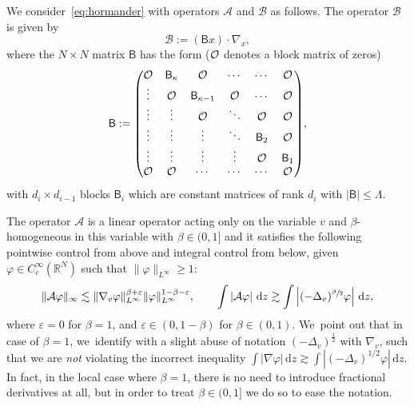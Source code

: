 \documentclass[10pt,a4paper]{amsart}
\let\epsilon\varepsilon
\theoremstyle{definition}
\newcommand\R{{\mathbb R}}
\newcommand{\cA}{{\mathcal A}}
\newcommand{\cB}{{\mathcal B}}
\newcommand{\sB}{{\mathsf B}}
\newcommand{\dd}{{\, \mathrm d}}
\begin{document}
We consider~\eqref{eq:hormander} with operators $\cA$ and $\cB$
as follows. The operator $\cB$ is given by
\begin{equation*}
\cB := (\sB x) \cdot \nabla_x,
\end{equation*}
where the $N \times N$ matrix $\sB$ has the form (${\mathcal O}$ denotes a
block matrix of zeros)
\begin{equation} \label{B_0}\arraycolsep5.5pt
\sB
:=
\begin{pmatrix}
\OO & \sB_\kappa & \OO & \cdots & \cdots & \OO \\
\vdots & \OO & \sB_{\kappa-1} & \OO & \cdots & \OO\\
\vdots & \vdots & \OO & \ddots & \OO & \OO \\
\vdots & \vdots & \vdots & \ddots & \sB_2 & \OO \\
\vdots & \vdots & \vdots & \vdots & \OO & \sB_1 \\
\OO & \OO & \cdots & \cdots & \cdots & \OO
\end{pmatrix}\!,
\end{equation}
with $d_{i} \times d_{i-1}$ blocks $\sB_i$ which are constant
matrices of rank $d_i$ with $|\sB|\leq \Lambda$.

The operator $\cA$ is a linear operator acting only on the
variable $v$ and $\beta$\nobreakdash-homogeneous in this variable with
$\beta \in (0,1]$ and it satisfies the following pointwise
control from above and integral control from below, given
$\varphi \in C^\infty_c(\R^N)$ such that $\| \varphi \|_{L^\infty}\geq 1$:
\begin{equation}
\label{eq:hypA}
\| \cA \varphi \|_\infty \lesssim \| \nabla_{v} \varphi
\|_{L^\infty} ^{\beta+\epsilon} \| \varphi \|_{L^\infty} ^{1-\beta-\epsilon}, \qquad
\int \left| \cA \varphi \right| \dd z \gtrsim
\int \left| (-\Delta_v)^{\sfrac{\beta}{2}} \varphi \right| \dd z,
\end{equation}
where $\epsilon = 0$ for $\beta = 1$, and $\epsilon \in (0, 1-\beta)$ for $\beta \in (0, 1)$. We~point out that in case of $\beta = 1$, we~identify with a slight abuse of notation $(-\Delta_{v})^{\frac{1}{2}}$ with $\nabla_{v}$, such that we are \textit{not} violating the incorrect inequality $\int \left| \nabla \varphi\right| \dd z \gtrsim \int \left| (-\Delta_v)^{1/2} \varphi \right| \dd z$. In fact, in the local case where $\beta = 1$, there is no need to introduce fractional derivatives at all, but in order to treat $\beta \in (0, 1]$ we do so to ease the notation.
\end{document}

